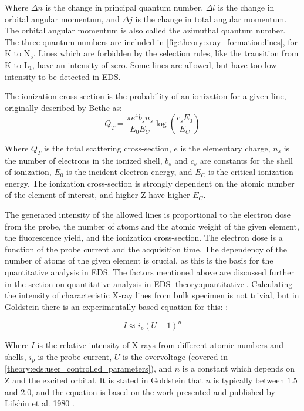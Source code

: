 Where $\Delta n$ is the change in principal quantum number, $\Delta l$ is the change in orbital angular momentum, and $\Delta j$ is the change in total angular momentum.
The orbital angular momentum is also called the azimuthal quantum number.
The three quantum numbers are included in \cref{fig:theory:xray_formation:lines}, for K to N$_5$.
Lines which are forbidden by the selection rules, like the transition from K to L$_1$, have an intensity of zero.
Some lines are allowed, but have too low intensity to be detected in EDS.


The ionization cross-section is the probability of an ionization for a given line, originally described by Bethe \cite{inokuti_on_bethe_1971} as:
\begin{equation}
    \label{eq:ionizationcrosssection}
    Q_T = \frac{\pi e^4 b_s n_s}{E_0 E_C}  \log\left(\frac{c_s E_0}{E_C}\right)
\end{equation}

Where $Q_T$ is the total scattering cross-section, $e$ is the elementary charge, $n_s$ is the number of electrons in the ionized shell, $b_s$ and $c_s$ are constants for the shell of ionization, $E_0$ is the incident electron energy, and $E_C$ is the critical ionization energy.
The ionization cross-section is strongly dependent on the atomic number of the element of interest, and higher Z have higher $E_C$.


The generated intensity of the allowed lines is proportional to the electron dose from the probe, the number of atoms and the atomic weight of the given element, the fluorescence yield, and the ionization cross-section. %
The electron dose is a function of the probe current and the acquisition time.
The dependency of the number of atoms of the given element is crucial, as this is the basis for the quantitative analysis in EDS.
The factors mentioned above are discussed further in the section on quantitative analysis in EDS \cref{theory:quantitative}.
Calculating the intensity of characteristic X-ray lines from bulk specimen is not trivial, but in Goldstein there is an experimentally based equation for this: \cite[Eq. 4.8]{goldstein_scanning_2018}:

\begin{equation}
    \label{eq:theory:xray_formation:intensity}
    I \approx i_p (U-1)^n
\end{equation}

Where $I$ is the relative intensity of X-rays from different atomic numbers and shells, $i_p$ is the probe current, $U$ is the overvoltage (covered in \cref{theory:eds:user_controlled_parameters}), and $n$ is a constant which depends on Z and the excited orbital.
It is stated in Goldstein that $n$ is typically between $1.5$ and $2.0$, and the equation is based on the work presented and published by Lifshin et al. 1980 \cite{lifshin1980}.



